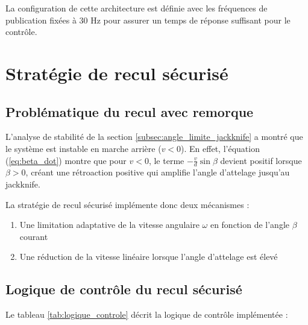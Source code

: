 \documentclass[a4paper,12pt]{report}
\begin{document}
La configuration de cette architecture est définie avec les fréquences de publication fixées à 30 Hz pour assurer un temps de réponse suffisant pour le contrôle.

\section{Stratégie de recul sécurisé}
\label{sec:strategie_recul}

\subsection{Problématique du recul avec remorque}
\label{subsec:problematique_recul}

L'analyse de stabilité de la section \ref{subsec:angle_limite_jackknife} a montré que le système est instable en marche arrière ($v < 0$). En effet, l'équation (\ref{eq:beta_dot}) montre que pour $v < 0$, le terme $-\frac{v}{d}\sin\beta$ devient positif lorsque $\beta > 0$, créant une rétroaction positive qui amplifie l'angle d'attelage jusqu'au jackknife.

La stratégie de recul sécurisé implémente donc deux mécanismes :
\begin{enumerate}
    \item Une limitation adaptative de la vitesse angulaire $\omega$ en fonction de l'angle $\beta$ courant
    \item Une réduction de la vitesse linéaire lorsque l'angle d'attelage est élevé
\end{enumerate}

\subsection{Logique de contrôle du recul sécurisé}
\label{subsec:logique_recul}

Le tableau \ref{tab:logique_controle} décrit la logique de contrôle implémentée :
\end{document}
